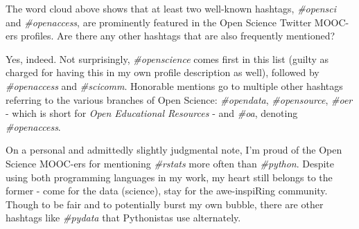 \documentclass[]{article}
\newenvironment{Shaded}{\begin{snugshade}}{\end{snugshade}}
\newcommand{\KeywordTok}[1]{\textcolor[rgb]{0.13,0.29,0.53}{\textbf{#1}}}
\newcommand{\DataTypeTok}[1]{\textcolor[rgb]{0.13,0.29,0.53}{#1}}
\newcommand{\DecValTok}[1]{\textcolor[rgb]{0.00,0.00,0.81}{#1}}
\newcommand{\StringTok}[1]{\textcolor[rgb]{0.31,0.60,0.02}{#1}}
\newcommand{\CommentTok}[1]{\textcolor[rgb]{0.56,0.35,0.01}{\textit{#1}}}
\newcommand{\OtherTok}[1]{\textcolor[rgb]{0.56,0.35,0.01}{#1}}
\newcommand{\OperatorTok}[1]{\textcolor[rgb]{0.81,0.36,0.00}{\textbf{#1}}}
\newcommand{\NormalTok}[1]{#1}
\begin{document}
\begin{Shaded}
\end{Shaded}

\hypertarget{htmlwidget-ab26be86248c276def2a}{}

The word cloud above shows that at least two well-known hashtags,
\emph{\#opensci} and \emph{\#openaccess}, are prominently featured in
the Open Science Twitter MOOC-ers profiles. Are there any other hashtags
that are also frequently mentioned?

Yes, indeed. Not surprisingly, \emph{\#openscience} comes first in this
list (guilty as charged for having this in my own profile description as
well), followed by \emph{\#openaccess} and \emph{\#scicomm}. Honorable
mentions go to multiple other hashtags referring to the various branches
of Open Science: \emph{\#opendata}, \emph{\#opensource}, \emph{\#oer} -
which is short for \emph{Open Educational Resources} - and \emph{\#oa},
denoting \emph{\#openaccess}.

On a personal and admittedly slightly judgmental note, I'm proud of the
Open Science MOOC-ers for mentioning \emph{\#rstats} more often than
\emph{\#python}. Despite using both programming languages in my work, my
heart still belongs to the former - come for the data (science), stay
for the awe-inspiRing community. Though to be fair and to potentially
burst my own bubble, there are other hashtags like \emph{\#pydata} that
Pythonistas use alternately.
\end{document}
